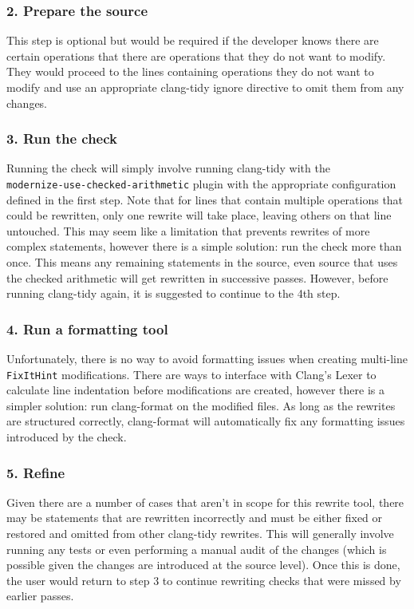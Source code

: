 \subsubsection{2. Prepare the source}

This step is optional but would be required if the developer knows there are certain operations that there are operations that they do not want to modify. They would proceed to the lines containing operations they do not want to modify and use an appropriate clang-tidy ignore directive to omit them from any changes.

\subsubsection{3. Run the check}

Running the check will simply involve running clang-tidy with the \\ \texttt{modernize-use-checked-arithmetic} plugin with the appropriate configuration defined in the first step. Note that for lines that contain multiple operations that could be rewritten, only one rewrite will take place, leaving others on that line untouched. This may seem like a limitation that prevents rewrites of more complex statements, however there is a simple solution: run the check more than once. This means any remaining statements in the source, even source that uses the checked arithmetic will get rewritten in successive passes. However, before running clang-tidy again, it is suggested to continue to the 4th step.

\subsubsection{4. Run a formatting tool}

Unfortunately, there is no way to avoid formatting issues when creating multi-line \texttt{FixItHint} modifications. There are ways to interface with Clang's Lexer to calculate line indentation before modifications are created, however there is a simpler solution: run clang-format on the modified files. As long as the rewrites are structured correctly, clang-format will automatically fix any formatting issues introduced by the check.

\subsubsection{5. Refine}

Given there are a number of cases that aren't in scope for this rewrite tool, there may be statements that are rewritten incorrectly and must be either fixed or restored and omitted from other clang-tidy rewrites. This will generally involve running any tests or even performing a manual audit of the changes (which is possible given the changes are introduced at the source level). Once this is done, the user would return to step 3 to continue rewriting checks that were missed by earlier passes.

